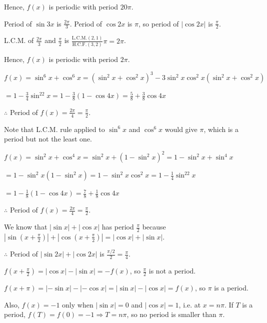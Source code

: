   Hence, $f(x)$ is periodic with period $20\pi$.

\item Period of $\sin3x$ is $\frac{2\pi}{3}$. Period of $\cos2x$ is $\pi$, so period of
  $|\cos2x|$ is $\frac{\pi}{2}$.

  L.C.M. of $\frac{2\pi}{3}$ and $\frac{\pi}{2}$ is $\frac{\mathrm{L.C.M.(2, 1)}}{\mathrm{H.C.F.(3,
  2)}}\pi = 2\pi$.

  Hence, $f(x)$ is periodic with period $2\pi$.

\item $f(x) = \sin^6x + \cos^6x = (\sin^2x + \cos^2x)^3 - 3\sin^2x\cos^2x(\sin^2x + \cos^2x)$

  $= 1 - \frac{3}{4}\sin^22x = 1 - \frac{3}{8}(1 - \cos4x) = \frac{5}{8} + \frac{3}{8}\cos4x$

  $\therefore$ Period of $f(x) = \frac{2\pi}{4} = \frac{\pi}{2}$.

  Note that L.C.M. rule applied to $\sin^6x$ and $\cos^6x$ would give $\pi$, which is a period but
  not the least one.

\item $f(x) = \sin^2x + \cos^4x = \sin^2x + (1 - \sin^2x)^2 = 1 - \sin^2x + \sin^4x$

  $= 1 - \sin^2x(1 - \sin^2x) = 1 - \sin^2x\cos^2x = 1 - \frac{1}{4}\sin^22x$

  $= 1 - \frac{1}{8}(1 - \cos4x) = \frac{7}{8} + \frac{1}{8}\cos4x$

  $\therefore$ Period of $f(x) = \frac{2\pi}{4} = \frac{\pi}{2}$.

\item We know that $|\sin x| + |\cos x|$ has period $\frac{\pi}{2}$ because
  $\left|\sin\left(x + \frac{\pi}{2}\right)\right| + \left|\cos\left(x + \frac{\pi}{2}\right)\right| =
  |\cos x| + |\sin x|$.

  $\therefore$ Period of $|\sin2x| + |\cos2x|$ is $\frac{\pi/2}{2} = \frac{\pi}{4}$.

\item $f\left(x + \frac{\pi}{2}\right) = |\cos x| - |\sin x| = -f(x)$, so $\frac{\pi}{2}$ is not a
  period.

  $f(x + \pi) = |-\sin x| - |-\cos x| = |\sin x| - |\cos x| = f(x)$, so $\pi$ is a period.

  Also, $f(x) = -1$ only when $|\sin x| = 0$ and $|\cos x| = 1$, i.e. at $x = n\pi$. If $T$ is a
  period, $f(T) = f(0) = -1 \Rightarrow T = n\pi$, so no period is smaller than $\pi$.

